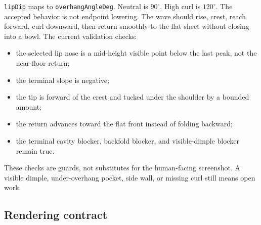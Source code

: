 \documentclass[12pt,letterpaper]{article}
\newcommand{\code}[1]{\texttt{#1}}
\begin{document}
\code{lipDip} maps to \code{overhangAngleDeg}. Neutral is \(90^\circ\). High curl is \(120^\circ\). The accepted behavior is not endpoint lowering. The wave should rise, crest, reach forward, curl downward, then return smoothly to the flat sheet without closing into a bowl. The current validation checks:
\begin{itemize}
  \item the selected lip nose is a mid-height visible point below the last peak, not the near-floor return;
  \item the terminal slope is negative;
  \item the tip is forward of the crest and tucked under the shoulder by a bounded amount;
  \item the return advances toward the flat front instead of folding backward;
  \item the terminal cavity blocker, backfold blocker, and visible-dimple blocker remain true.
\end{itemize}
These checks are guards, not substitutes for the human-facing screenshot. A visible dimple, under-overhang pocket, side wall, or missing curl still means open work.

\subsection{Rendering contract}
\end{document}
